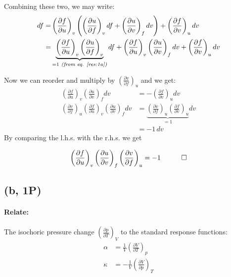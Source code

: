 \documentclass[a4paper]{article}
\begin{document}
Combining these two, we may write:
\begin{align}
    df=&\left(\frac{\partial f}{\partial u}\right)_v\left(\left(\frac{\partial u}{\partial f}\right)_vdf+\left(\frac{\partial u}{\partial v}\right)_fdv\right)+\left(\frac{\partial f}{\partial v}\right)_udv \\
    =&\underbrace{\left(\frac{\partial f}{\partial u}\right)_v\left(\frac{\partial u}{\partial f}\right)_v}_{=1 \textit{ (from eq. \ref{res:1a})}}df+\left(\frac{\partial f}{\partial u}\right)_v\left(\frac{\partial u}{\partial v}\right)_fdv+\left(\frac{\partial f}{\partial v}\right)_udv
\end{align}

Now we can reorder and multiply by $\left(\frac{\partial v}{\partial f}\right)_u$ and we get:
\begin{align}
    \left(\frac{\partial f}{\partial u}\right)_v\left(\frac{\partial u}{\partial v}\right)_fdv&=-\left(\frac{\partial f}{\partial v}\right)_udv\\
    \left(\frac{\partial v}{\partial f}\right)_u \left(\frac{\partial f}{\partial u}\right)_v\left(\frac{\partial u}{\partial v}\right)_fdv& = \underbrace{\left(\frac{\partial v}{\partial f}\right)_u \left(\frac{\partial f}{\partial v}\right)_u}_{=1}dv \\
    &=-1\, dv
\end{align}
By comparing the l.h.s. with the r.h.s. we get
\begin{framed}
    \begin{equation}
        \left(\frac{\partial f}{\partial u}\right)_v\left(\frac{\partial u}{\partial v}\right)_f\left(\frac{\partial v}{\partial f}\right)_u=-1 \quad \qed
    \end{equation}
\end{framed}

\subsection{(b, 1P)}\label{problem1}
\paragraph{Relate:}

The isochoric pressure change $\left( \frac{\partial p}{\partial T}  \right)_V$ to the standard response functions:
\begin{align}
    \alpha &= \frac{1}{V} \left( \frac{\partial V}{\partial T} \right)_p \label{alpha}\\ 
    \kappa &= -\frac{1}{V} \left( \frac{\partial V}{\partial p} \right)_T \label{kappat}
\end{align}
\end{document}
